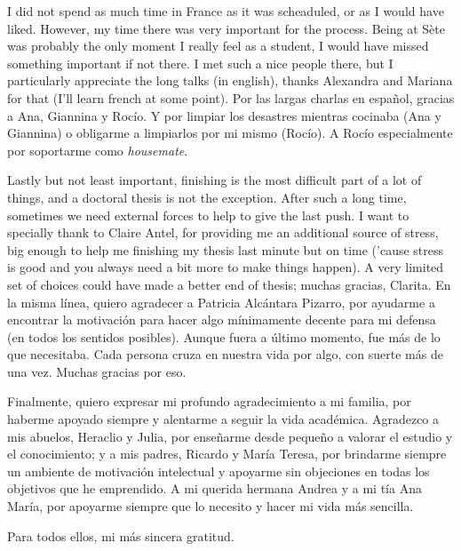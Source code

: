 I did not spend as much time in France as it was scheaduled, or as I would have liked. However, my time there was very important for the process. Being at S\`ete was probably the only moment I really feel as a student, I would have missed something important if not there. I met such a nice people there, but I particularly appreciate the long talks (in english), thanks Alexandra and Mariana for that (I'll learn french at some point). Por las largas charlas en español, gracias a Ana, Giannina y Rocío. Y por limpiar los desastres mientras cocinaba (Ana y Giannina) o obligarme a limpiarlos por mi mismo (Rocío). A Rocío especialmente por soportarme como \emph{housemate}.

Lastly but not least important, finishing is the most difficult part of a lot of things, and a doctoral thesis is not the exception. After such a long time, sometimes we need external forces to help to give the last push. I want to specially thank to Claire Antel, for providing me an additional source of stress, big enough to help me finishing my thesis last minute but on time ('cause stress is good and you always need a bit more to make things happen). A very limited set of choices could have made a better end of thesis; muchas gracias, Clarita. En la misma línea, quiero agradecer a Patricia Alcántara Pizarro, por ayudarme a encontrar la motivación para hacer algo mínimamente decente para mi defensa (en todos los sentidos posibles). Aunque fuera a último momento, fue más de lo que necesitaba. Cada persona cruza en nuestra vida por algo, con suerte más de una vez. Muchas gracias por eso.

Finalmente, quiero expresar mi profundo agradecimiento a mi familia, por haberme apoyado siempre y alentarme a seguir la vida académica. Agradezco a mis abuelos, Heraclio y Julia, por enseñarme desde pequeño a valorar el estudio y el conocimiento; y a mis padres, Ricardo y María Teresa, por brindarme siempre un ambiente de motivación intelectual y apoyarme sin objeciones en todas los objetivos que he emprendido. A mi querida hermana Andrea y a mi tía Ana María, por apoyarme siempre que lo necesito y hacer mi vida más sencilla. 

Para todos ellos, mi más sincera gratitud.


